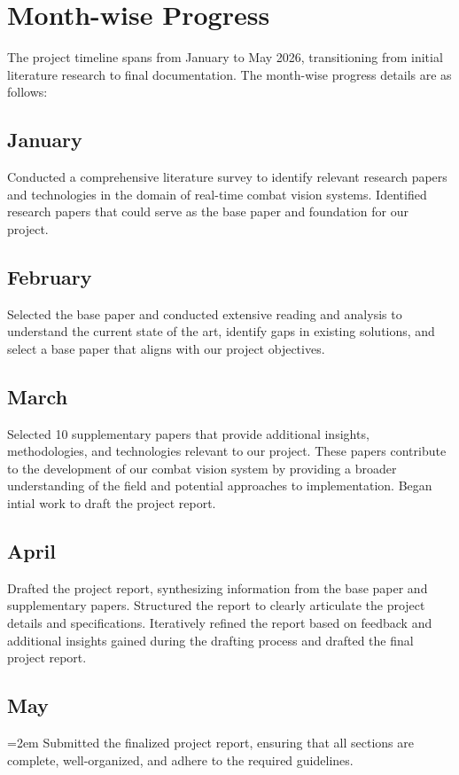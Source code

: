 \label{end:gantt}
\section{Month-wise Progress}\label{sec:progress}
The project timeline spans from January to May 2026, transitioning from initial literature research
to final documentation. The month-wise progress details are as follows:

\subsection{January}
Conducted a comprehensive literature survey to identify relevant research papers and technologies in
the domain of real-time combat vision systems. Identified research papers that could serve as the
base paper and foundation for our project.

\subsection{February}
Selected the base paper and conducted extensive reading and analysis to understand the current state
of the art, identify gaps in existing solutions, and select a base paper that aligns with our
project objectives.

\subsection{March}
Selected 10 supplementary papers that provide additional insights, methodologies, and technologies
relevant to our project. These papers contribute to the development of our combat vision system by
providing a broader understanding of the field and potential approaches to implementation. Began
intial work to draft the project report.

\subsection{April}
Drafted the project report, synthesizing information from the base paper and supplementary papers.
Structured the report to clearly articulate the project details and specifications. Iteratively
refined the report based on feedback and additional insights gained during the drafting process and
drafted the final project report.

\subsection{May}
\begingroup\emergencystretch=2em
  Submitted the finalized project report, ensuring that all sections are complete, well-organized,
  and adhere to the required guidelines.
  \label{end:progress}\label{end:scheduling}
\par\endgroup
